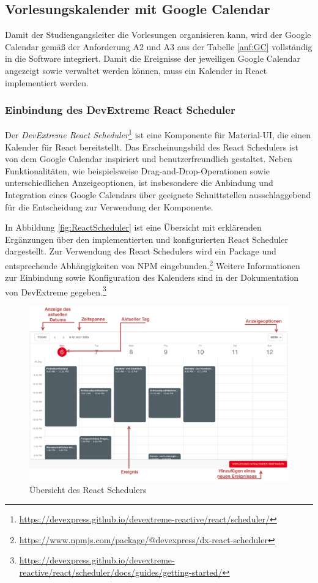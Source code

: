 \subsection{Vorlesungskalender mit Google Calendar}\label{ch:GC}
Damit der Studiengangsleiter die Vorlesungen organisieren kann, wird der Google Calendar gemäß der Anforderung A2 und A3 aus der Tabelle \ref{anf:GC} vollständig in die Software integriert.
Damit die Ereignisse der jeweiligen Google Calendar angezeigt sowie verwaltet werden können, muss ein Kalender in React implementiert werden. 

\subsubsection{Einbindung des DevExtreme React Scheduler}
Der \textit{DevExtreme React Scheduler}\footnote{\url{https://devexpress.github.io/devextreme-reactive/react/scheduler/}} ist eine Komponente für Material-UI, die einen Kalender für React bereitstellt. 
Das Erscheinungsbild des React Schedulers ist von dem Google Calendar inspiriert und benutzerfreundlich gestaltet.\autocite[Vgl.][]{ReactScheduler} 
Neben Funktionalitäten, wie beispielsweise Drag-and-Drop-Operationen sowie unterschiedlichen Anzeigeoptionen, ist insbesondere die Anbindung und Integration eines Google Calendars über geeignete Schnittstellen ausschlaggebend für die Entscheidung zur Verwendung der Komponente. 

In Abbildung \vref{fig:ReactScheduler} ist eine Übersicht mit erklärenden Ergänzungen über den implementierten und konfigurierten React Scheduler dargestellt. 
Zur Verwendung des React Schedulers wird ein Package und entsprechende Abhängigkeiten von NPM eingebunden.\footnote{\url{https://www.npmjs.com/package/@devexpress/dx-react-scheduler}}
Weitere Informationen zur Einbindung sowie Konfiguration des Kalenders sind in der Dokumentation von DevExtreme gegeben.\footnote{\url{https://devexpress.github.io/devextreme-reactive/react/scheduler/docs/guides/getting-started/}}
\begin{figure}[H]
	\centering 
	\includegraphics[width=\textwidth]{img/FrontEnd/ReactCalendar.pdf}
	\caption[Übersicht des React Schedulers]{\label{fig:ReactScheduler}Übersicht des React Schedulers}
\end{figure}

